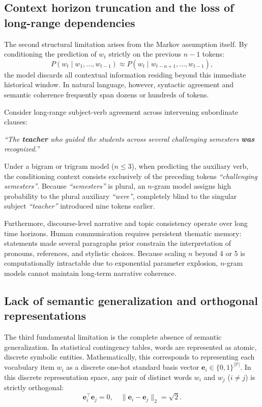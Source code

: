 \documentclass[../../../main.tex]{subfiles}
\begin{document}
\subsection{Context horizon truncation and the loss of long-range dependencies}
\label{subsec:context_truncation}

The second structural limitation arises from the Markov assumption itself. By conditioning the prediction of $w_t$ strictly on the previous $n-1$ tokens:
\begin{equation}
P(w_t \mid w_1, \dots, w_{t-1}) \approx P(w_t \mid w_{t-n+1}, \dots, w_{t-1}),
\end{equation}
the model discards all contextual information residing beyond this immediate historical window. In natural language, however, syntactic agreement and semantic coherence frequently span dozens or hundreds of tokens. 

Consider long-range subject-verb agreement across intervening subordinate clauses:
\begin{center}
\textit{``The \textbf{teacher} who guided the students across several challenging semesters \textbf{was} recognized.''}
\end{center}
Under a bigram or trigram model ($n \le 3$), when predicting the auxiliary verb, the conditioning context consists exclusively of the preceding tokens \textit{``challenging semesters''}. Because \textit{``semesters''} is plural, an $n$-gram model assigns high probability to the plural auxiliary \textit{``were''}, completely blind to the singular subject \textit{``teacher''} introduced nine tokens earlier.

Furthermore, discourse-level narrative and topic consistency operate over long time horizons. Human communication requires persistent thematic memory: statements made several paragraphs prior constrain the interpretation of pronouns, references, and stylistic choices. Because scaling $n$ beyond 4 or 5 is computationally intractable due to exponential parameter explosion, $n$-gram models cannot maintain long-term narrative coherence.

\subsection{Lack of semantic generalization and orthogonal representations}
\label{subsec:lack_of_semantics}

The third fundamental limitation is the complete absence of semantic generalization. In statistical contingency tables, words are represented as atomic, discrete symbolic entities. Mathematically, this corresponds to representing each vocabulary item $w_i$ as a discrete one-hot standard basis vector $\mathbf{e}_i \in \{0, 1\}^{|\mathcal{V}|}$. In this discrete representation space, any pair of distinct words $w_i$ and $w_j$ ($i \neq j$) is strictly orthogonal:
\begin{equation}
\mathbf{e}_i^\top \mathbf{e}_j = 0, \quad \|\mathbf{e}_i - \mathbf{e}_j\|_2 = \sqrt{2}.
\end{equation}
\end{document}
